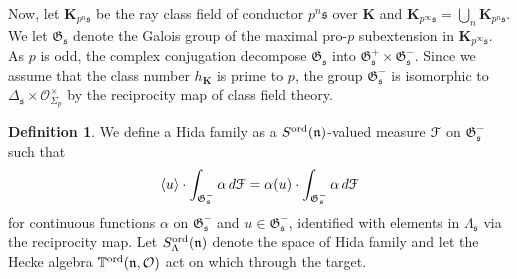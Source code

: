 \documentclass[leqno]{amsart}
\newcommand{\euF}{\EuScript{F}} %
\newcommand{\TT}{\mathbb{T}} %
\newcommand{\fG}{\mathfrak{G}}
\newcommand{\ord}{\textnormal{ord}}
\newcommand{\K}{{\mathbf{K}}} %
\newcommand{\oo}{\mathcal{O}} %
\newcommand{\fs}{\mathfrak{s}}
\newcommand{\fn}{\mathfrak{n}}
\theoremstyle{definition}
\newtheorem{defn}[thm]{Definition}
\theoremstyle{remark}
\begin{document}
Now, let $\K_{p^n\fs}$ be the ray class field of conductor 
$p^n\fs$ over $\K$ and 
$\K_{p^\infty\fs}=\bigcup_{n}\K_{p^n\fs}$.
We let $\fG_{\fs}$ denote
the Galois group of the maximal pro-$p$ 
subextension in $\K_{p^\infty\fs}$.
As $p$ is odd, the complex conjugation
decompose  $\fG_{\fs}$ into
$\fG_{\fs}^+\times\fG_{\fs}^-$.
Since we assume that the class number 
$h_\K$ is prime to  $p$,
the group $\fG_{\fs}^-$
is isomorphic to 
$\Delta_{\fs}\times \oo_{\Sigma_p}^\times$ 
by the reciprocity map of class field theory.

\begin{defn}
We define a Hida family as a 
$S^{\ord}(\fn)$-valued measure $\euF$ on $\fG_{\fs}^-$
such that 
\begin{equation}\label{def:Hida_family}
	\langle u\rangle \cdot 
	\int_{\fG_{\fs}^-}\alpha\,d\euF=
	\alpha(u)\cdot \int_{\fG_{\fs}^-}\alpha\,d\euF
\end{equation}
for continuous functions $\alpha$ on  $\fG_{\fs}^-$
and $u\in \fG_{\fs}^{-}$, 
identified with elements in $\Lambda_{\fs}$
via the reciprocity map.
Let $S^\ord_\Lambda(\fn)$
denote the space of Hida family
and let the Hecke algebra
$\TT^{\ord}(\fn,\oo)$
act on which through the target.
\end{defn}
\end{document}
